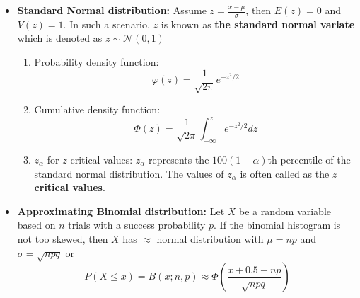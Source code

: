 \documentclass[a4paper]{article}
\begin{document}
\begin{itemize}
    \item \textbf{Standard Normal distribution: } Assume $z = \frac{x-\mu}{\sigma}$, then $E(z) = 0$ and $V(z) = 1$. In such a scenario, $z$ is known as \textbf{the standard normal variate} which is denoted as $z\sim\mathcal{N}(0,1)$
    \begin{enumerate}
        \item Probability density function:
        \begin{equation*}
            \varphi(z) = \frac{1}{\sqrt{2\pi}}e^{-z^2/2}
        \end{equation*}
        \item Cumulative density function:
        \begin{equation*}
            \Phi(z) = \frac{1}{\sqrt{2\pi}}\int_{-\infty}^{z} e^{-z^2/2}dz
        \end{equation*}
        \item $z_\alpha$ for $z$ critical values: $z_\alpha$ represents the $100(1-\alpha)$th percentile of the standard normal distribution. The values of $z_\alpha$ is often called as the $z$ \textbf{critical values}.
        \begin{center}
        \end{center}
    \end{enumerate}
    \item \textbf{Approximating Binomial distribution:}
    Let $X$ be a random variable based on $n$ trials with a success probability $p$. If the binomial histogram is not too skewed, then $X$ has $\approx$ normal distribution with $\mu = np$ and $\sigma = \sqrt{npq}$ or 
    \begin{equation*}
        P(X\leq x) = B(x; n,p) \approx \Phi\left(\frac{x+0.5-np}{\sqrt{npq}}\right)
    \end{equation*}
    

\end{itemize}
\end{document}
